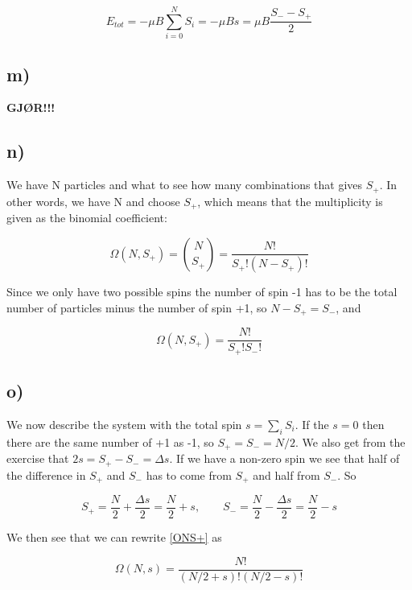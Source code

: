 \documentclass[a4paper,norsk, 10pt]{article}
\begin{document}
\begin{equation}
E_{tot} = -\mu B\sum_{i = 0}^{N}S_i = -\mu B s = \mu B\frac{S_- - S_+}{2}
\end{equation}

\subsection{m)}

\textbf{GJØR!!!}

\subsection{n)}
We have N particles and what to see how many combinations that gives $S_+$. In other words, we have N and choose $S_+$, which means that the multiplicity is given as the binomial coefficient:

\begin{equation}
\Omega(N,S_+) = \binom{N}{S_+} = \frac{N!}{S_+!(N-S_+)!}
\end{equation}

Since we only have two possible spins the number of spin -1 has to be the total number of particles minus the number of spin +1, so $N-S_+ = S_-$, and

\begin{equation}
\Omega(N,S_+) = \frac{N!}{S_+!S_-!}
\end{equation}\label{ONS+}

\subsection{o)}

We now describe the system with the total spin $s = \sum_i S_i$. If the $s=0$ then there are the same number of +1 as -1, so $S_+ = S_- = N/2$. We also get from the exercise that $2s = S_+ - S_- = \Delta s$. If we have a non-zero spin we see that half of the difference in $S_+$ and $S_-$ has to come from $S_+$ and half from $S_-$. So

\begin{equation}
S_+ = \frac{N}{2} + \frac{\Delta s}{2} = \frac{N}{2} + s, \qquad S_- = \frac{N}{2} - \frac{\Delta s}{2} = \frac{N}{2} - s 
\end{equation}

We then see that we can rewrite \eqref{ONS+} as

\begin{equation}
\Omega(N,s) = \frac{N!}{(N/2 + s)!(N/2-s)!}
\end{equation}
\end{document}
